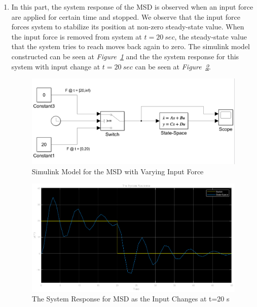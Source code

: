\documentclass[a4paper,12pt]{article}
\begin{document}
\begin{enumerate}
\begin{enumerate}
\begin{enumerate}
			
		\end{enumerate}			
			
			\item 	In this part, the system response of the MSD is observed when an input force are applied for certain time and stopped. We observe that the input force forces system to stabilize its position at non-zero steady-state value. When the input force is removed from system at $t=20~sec$, the steady-state value that the system tries to reach moves back again to zero. The simulink model constructed can be seen at \textit{Figure~\ref{fig:1d1}} and the the system response for this system with input change at $t=20~sec$ can be seen at \textit{Figure~\ref{fig:1d2}}.

				\begin{figure}[H]
					\center
					\setlength{\unitlength}{\textwidth} 
					\includegraphics[width=0.8\unitlength]{images/1d1ey}
					\caption{\label{fig:1d1} Simulink Model for the MSD with Varying Input Force }
				\end{figure}
				
				\begin{figure}[H]
					\center
					\setlength{\unitlength}{\textwidth} 
					\includegraphics[width=0.8\unitlength]{images/1d2ey}
					\caption{\label{fig:1d2} The System Response for MSD as the Input Changes at t=20 s }
				\end{figure}
				

\end{enumerate}
\end{enumerate}
\end{document}
